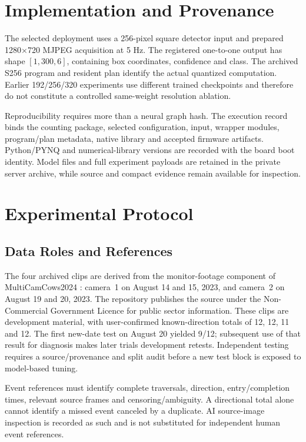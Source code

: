 \documentclass[journal]{IEEEtran}
\begin{document}
\section{Implementation and Provenance}
The selected deployment uses a 256-pixel square detector input and prepared 1280$\times$720 MJPEG acquisition at 5 Hz. The registered one-to-one output has shape $[1,300,6]$, containing box coordinates, confidence and class. The archived S256 program and resident plan identify the actual quantized computation. Earlier 192/256/320 experiments use different trained checkpoints and therefore do not constitute a controlled same-weight resolution ablation.

Reproducibility requires more than a neural graph hash. The execution record binds the counting package, selected configuration, input, wrapper modules, program/plan metadata, native library and accepted firmware artifacts. Python/PYNQ and numerical-library versions are recorded with the board boot identity. Model files and full experiment payloads are retained in the private server archive, while source and compact evidence remain available for inspection.

\section{Experimental Protocol}
\subsection{Data Roles and References}
The four archived clips are derived from the monitor-footage component of MultiCamCows2024 \cite{multicamcows2024}: camera~1 on August 14 and 15, 2023, and camera~2 on August 19 and 20, 2023. The repository publishes the source under the Non-Commercial Government Licence for public sector information. These clips are development material, with user-confirmed known-direction totals of 12, 12, 11 and 12. The first new-date test on August 20 yielded 9/12; subsequent use of that result for diagnosis makes later trials development retests. Independent testing requires a source/provenance and split audit before a new test block is exposed to model-based tuning.

Event references must identify complete traversals, direction, entry/completion times, relevant source frames and censoring/ambiguity. A directional total alone cannot identify a missed event canceled by a duplicate. AI source-image inspection is recorded as such and is not substituted for independent human event references.
\end{document}
